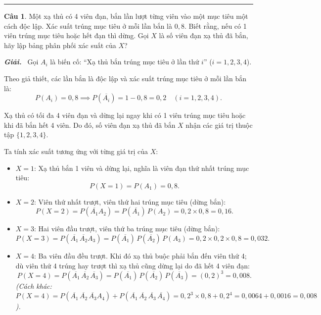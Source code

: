 \documentclass[12pt,a4paper]{article}
\theoremstyle{definition}
\newtheorem{cau}{Câu}
\newcommand{\giai}{\noindent\textbf{\textit{Giải.}}\ }
\begin{document}
\vspace{0.5em}
\hrule
\vspace{1em}

\begin{cau}
Một xạ thủ có 4 viên đạn, bắn lần lượt từng viên vào một mục tiêu một cách độc lập. Xác suất trúng mục tiêu ở mỗi lần bắn là $0{,}8$. Biết rằng, nếu có 1 viên trúng mục tiêu hoặc hết đạn thì dừng. Gọi $X$ là số viên đạn xạ thủ đã bắn, hãy lập bảng phân phối xác suất của $X$?
\end{cau}

\giai
Gọi $A_i$ là biến cố: ``Xạ thủ bắn trúng mục tiêu ở lần thứ $i$'' ($i = 1, 2, 3, 4$).

Theo giả thiết, các lần bắn là độc lập và xác suất trúng mục tiêu ở mỗi lần bắn là:
\[
P(A_i) = 0{,}8 \implies P(\overline{A_i}) = 1 - 0{,}8 = 0{,}2 \quad (i = 1, 2, 3, 4).
\]

Xạ thủ có tối đa 4 viên đạn và dừng lại ngay khi có 1 viên trúng mục tiêu hoặc khi đã bắn hết 4 viên. Do đó, số viên đạn xạ thủ đã bắn $X$ nhận các giá trị thuộc tập $\{1, 2, 3, 4\}$.

Ta tính xác suất tương ứng với từng giá trị của $X$:
\begin{itemize}
    \item $X = 1$: Xạ thủ bắn 1 viên và dừng lại, nghĩa là viên đạn thứ nhất trúng mục tiêu:
    \[
    P(X = 1) = P(A_1) = 0{,}8.
    \]
    \item $X = 2$: Viên thứ nhất trượt, viên thứ hai trúng mục tiêu (dừng bắn):
    \[
    P(X = 2) = P(\overline{A_1} A_2) = P(\overline{A_1})\,P(A_2) = 0{,}2 \times 0{,}8 = 0{,}16.
    \]
    \item $X = 3$: Hai viên đầu trượt, viên thứ ba trúng mục tiêu (dừng bắn):
    \[
    P(X = 3) = P(\overline{A_1}\,\overline{A_2} A_3) = P(\overline{A_1})\,P(\overline{A_2})\,P(A_3) = 0{,}2 \times 0{,}2 \times 0{,}8 = 0{,}032.
    \]
    \item $X = 4$: Ba viên đầu đều trượt. Khi đó xạ thủ buộc phải bắn đến viên thứ 4; dù viên thứ 4 trúng hay trượt thì xạ thủ cũng dừng lại do đã hết 4 viên đạn:
    \[
    P(X = 4) = P(\overline{A_1}\,\overline{A_2}\,\overline{A_3}) = P(\overline{A_1})\,P(\overline{A_2})\,P(\overline{A_3}) = (0{,}2)^3 = 0{,}008.
    \]
    \textit{(Cách khác: $P(X = 4) = P(\overline{A_1}\,\overline{A_2}\,\overline{A_3} A_4) + P(\overline{A_1}\,\overline{A_2}\,\overline{A_3}\,\overline{A_4}) = 0{,}2^3 \times 0{,}8 + 0{,}2^4 = 0{,}0064 + 0{,}0016 = 0{,}008$).}
\end{itemize}
\end{document}
